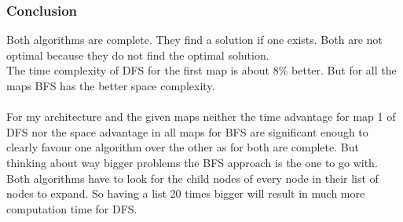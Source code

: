 \documentclass[paper=a4, fontsize=11pt]{scrartcl} %
\numberwithin{equation}{section} %
\numberwithin{figure}{section} %
\numberwithin{table}{section} %
\begin{document}
\subsubsection{Conclusion}
Both algorithms are complete. They find a solution if one exists. Both are not optimal because they do not find the optimal solution.\\
The time complexity of DFS for the first map is about 8\% better. But for all the maps BFS has the better space complexity.\\\\
For my architecture and the given maps neither the time advantage for map 1 of DFS nor the space advantage in all maps for BFS are significant enough to clearly favour one algorithm over the other as for both are complete. But thinking about way bigger problems the BFS approach is the one to go with.\\
Both algorithms have to look for the child nodes of every node in their list of nodes to expand. So having a list 20 times bigger will result in much more computation time for DFS.
\end{document}
